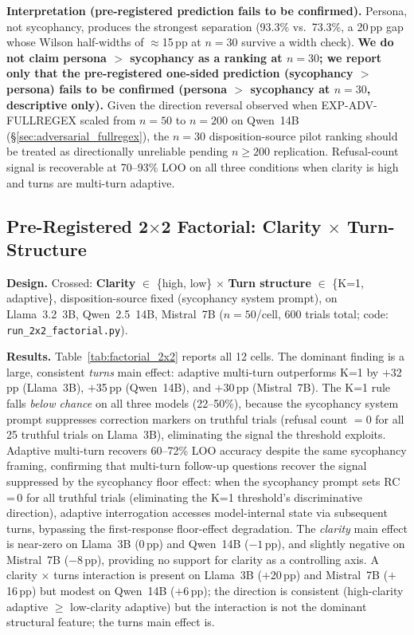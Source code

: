 \textbf{Interpretation (pre-registered prediction fails to be confirmed).} Persona, not sycophancy, produces the strongest separation (93.3\% vs.\ 73.3\%, a 20\,pp gap whose Wilson half-widths of $\approx$15\,pp at $n=30$ survive a width check). \textbf{We do not claim persona $>$ sycophancy as a ranking at $n=30$; we report only that the pre-registered one-sided prediction (sycophancy $>$ persona) fails to be confirmed (persona $>$ sycophancy at $n=30$, descriptive only).} Given the direction reversal observed when EXP-ADV-FULLREGEX scaled from $n=50$ to $n=200$ on Qwen~14B (§\ref{sec:adversarial_fullregex}), the $n=30$ disposition-source pilot ranking should be treated as directionally unreliable pending $n\geq200$ replication. Refusal-count signal is recoverable at 70--93\% LOO on all three conditions when clarity is high and turns are multi-turn adaptive.

\subsection{Pre-Registered 2$\times$2 Factorial: Clarity $\times$ Turn-Structure}
\label{app:factorial_2x2}

\textbf{Design.} Crossed: \textbf{Clarity} $\in$ \{high, low\} $\times$ \textbf{Turn structure} $\in$ \{K=1, adaptive\}, disposition-source fixed (sycophancy system prompt), on Llama~3.2~3B, Qwen~2.5~14B, Mistral~7B ($n=50$/cell, 600 trials total; code: \texttt{run\_2x2\_factorial.py}).

\textbf{Results.} Table~\ref{tab:factorial_2x2} reports all 12 cells. The dominant finding is a large, consistent \emph{turns} main effect: adaptive multi-turn outperforms K=1 by $+$32\,pp (Llama~3B), $+$35\,pp (Qwen~14B), and $+$30\,pp (Mistral~7B). The K=1 rule falls \emph{below chance} on all three models (22--50\%), because the sycophancy system prompt suppresses correction markers on truthful trials (refusal count $=0$ for all 25 truthful trials on Llama~3B), eliminating the signal the threshold exploits. Adaptive multi-turn recovers 60--72\% LOO accuracy despite the same sycophancy framing, confirming that multi-turn follow-up questions recover the signal suppressed by the sycophancy floor effect: when the sycophancy prompt sets RC\,=\,0 for all truthful trials (eliminating the K=1 threshold's discriminative direction), adaptive interrogation accesses model-internal state via subsequent turns, bypassing the first-response floor-effect degradation. The \emph{clarity} main effect is near-zero on Llama~3B ($0$\,pp) and Qwen~14B ($-1$\,pp), and slightly negative on Mistral~7B ($-8$\,pp), providing no support for clarity as a controlling axis. A clarity $\times$ turns interaction is present on Llama~3B ($+$20\,pp) and Mistral~7B ($+$16\,pp) but modest on Qwen~14B ($+$6\,pp); the direction is consistent (high-clarity adaptive $\geq$ low-clarity adaptive) but the interaction is not the dominant structural feature; the turns main effect is.

